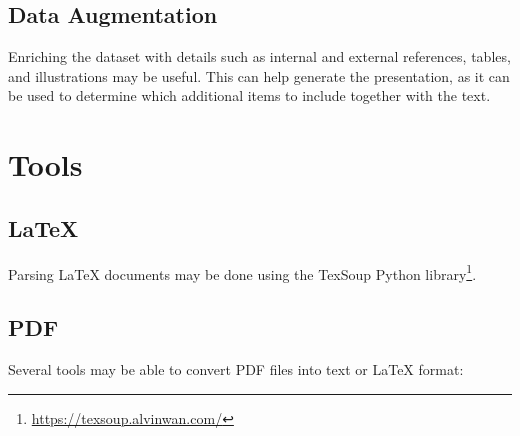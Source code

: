 \subsection{Data Augmentation}
Enriching the dataset with details such as internal and external references, tables, and illustrations may be useful. This can help generate the presentation, as it can be used to determine which additional items to include together with the text.

\section{Tools}

\subsection{\LaTeX{}}
Parsing \LaTeX{} documents may be done using the TexSoup Python library\footnote{\url{https://texsoup.alvinwan.com/}}.

\subsection{PDF}
Several tools may be able to convert PDF files into text or \LaTeX{} format: 

